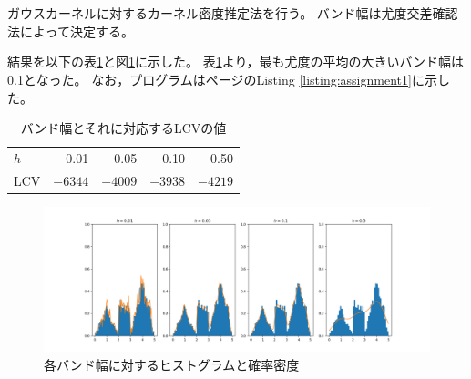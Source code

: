 \documentclass[class=jsarticle, crop=false, dvipdfmx, fleqn]{standalone}
\begin{document}
\section{}

ガウスカーネルに対するカーネル密度推定法を行う。
バンド幅は尤度交差確認法によって決定する。


結果を以下の表\ref{tab:result}と図\ref{fig:result}に示した。
表\ref{tab:result}より，最も尤度の平均の大きいバンド幅は0.1となった。
なお，プログラムは\pageref{listing:assignment1}ページのListing \ref{listing:assignment1}に示した。


\begin{table}[H]
    \centering
    \caption{バンド幅とそれに対応するLCVの値}
    \begin{tabular}{lrrrr}
        \(h\) & 0.01 & 0.05 & 0.10 & 0.50 \\
        LCV & \(-6344\) & \(-4009\) & \(-3938\) & \(-4219\)
    \end{tabular}
    \label{tab:result}
\end{table}

\begin{figure}[H]
    \centering
    \includegraphics[clip, width=18cm]{../figures/assignment1_result_global}
    \caption{各バンド幅に対するヒストグラムと確率密度}
    \label{fig:result}
\end{figure}
\end{document}
